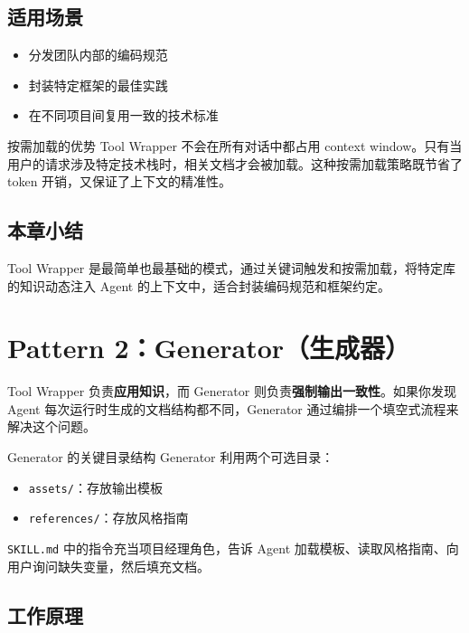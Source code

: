 \documentclass[a4paper]{article}
\begin{document}
\subsection{适用场景}

\begin{itemize}
    \item 分发团队内部的编码规范
    \item 封装特定框架的最佳实践
    \item 在不同项目间复用一致的技术标准
\end{itemize}

\begin{knowledgebox}{按需加载的优势}
Tool Wrapper 不会在所有对话中都占用 context window。只有当用户的请求涉及特定技术栈时，相关文档才会被加载。这种按需加载策略既节省了 token 开销，又保证了上下文的精准性。
\end{knowledgebox}

\subsection{本章小结}

Tool Wrapper 是最简单也最基础的模式，通过关键词触发和按需加载，将特定库的知识动态注入 Agent 的上下文中，适合封装编码规范和框架约定。

\section{Pattern 2：Generator（生成器）}

Tool Wrapper 负责\textbf{应用知识}，而 Generator 则负责\textbf{强制输出一致性}。如果你发现 Agent 每次运行时生成的文档结构都不同，Generator 通过编排一个填空式流程来解决这个问题。

\begin{importantbox}{Generator 的关键目录结构}
Generator 利用两个可选目录：
\begin{itemize}
    \item \texttt{assets/}：存放输出模板
    \item \texttt{references/}：存放风格指南
\end{itemize}
\texttt{SKILL.md} 中的指令充当项目经理角色，告诉 Agent 加载模板、读取风格指南、向用户询问缺失变量，然后填充文档。
\end{importantbox}

\subsection{工作原理}
\end{document}
